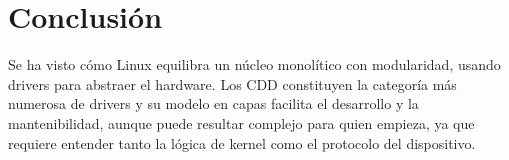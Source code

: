\section{Conclusión}
Se ha visto cómo Linux equilibra un núcleo monolítico con modularidad, usando drivers para abstraer el hardware. Los CDD constituyen la categoría más numerosa de drivers y su modelo en capas facilita el desarrollo y la mantenibilidad, aunque puede resultar complejo para quien empieza, ya que requiere entender tanto la lógica de kernel como el protocolo del dispositivo.
